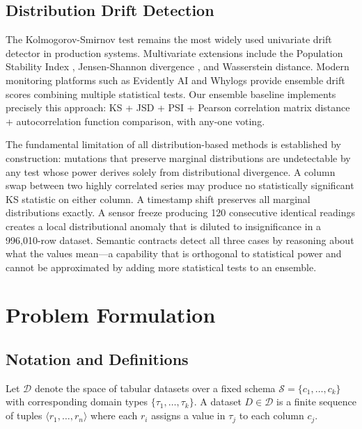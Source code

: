 \documentclass[journal]{IEEEtran}
\begin{document}
\subsection{Distribution Drift Detection}

The Kolmogorov-Smirnov test \cite{kolmogorov1933} remains the most widely
used univariate drift detector in production systems.  Multivariate
extensions include the Population Stability Index \cite{yurdakul2018psi},
Jensen-Shannon divergence \cite{lin1991jsd}, and Wasserstein distance.
Modern monitoring platforms such as Evidently AI and Whylogs provide
ensemble drift scores combining multiple statistical tests.  Our ensemble
baseline implements precisely this approach: KS + JSD + PSI + Pearson
correlation matrix distance + autocorrelation function comparison, with
any-one voting.

The fundamental limitation of all distribution-based methods is established
by construction: mutations that preserve marginal distributions are
undetectable by any test whose power derives solely from distributional
divergence.  A column swap between two highly correlated series may produce
no statistically significant KS statistic on either column.  A timestamp
shift preserves all marginal distributions exactly.  A sensor freeze
producing 120 consecutive identical readings creates a local distributional
anomaly that is diluted to insignificance in a 996,010-row dataset.
Semantic contracts detect all three cases by reasoning about what the
values mean---a capability that is orthogonal to statistical power and
cannot be approximated by adding more statistical tests to an ensemble.

\section{Problem Formulation}
\label{sec:formulation}

\subsection{Notation and Definitions}

Let $\mathcal{D}$ denote the space of tabular datasets over a fixed schema
$\mathcal{S} = \{c_1, \ldots, c_k\}$ with corresponding domain types
$\{\tau_1, \ldots, \tau_k\}$.  A dataset $D \in \mathcal{D}$ is a finite
sequence of tuples $\langle r_1, \ldots, r_n \rangle$ where each $r_i$
assigns a value in $\tau_j$ to each column $c_j$.
\end{document}
